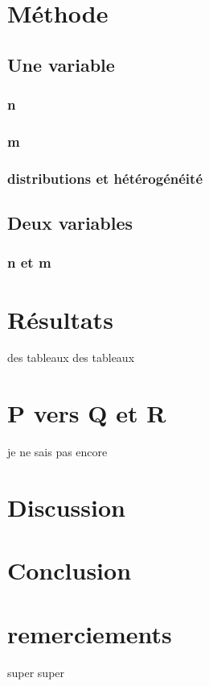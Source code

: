 \documentclass[a4paper,12pt]{report}
\theoremstyle{plain}				%
\theoremstyle{definition}				%
\begin{document}
\section{Méthode} \label{sec:methode}

\subsection{Une variable}\label{subsec:Une variable}

\subsubsection{n}\label{subsubsec:n}

\subsubsection{m}\label{subsubsec:m}

\subsubsection{distributions et hétérogénéité}\label{subsubsec:distributions et hétérogénéité}


\subsection{Deux variables}\label{subsec:Deux variables}

\subsubsection{n et m}\label{subsubsec:n et m}




\cite{5009071}


\section{Résultats} \label{sec:resultats}

des tableaux des tableaux 



\section{P vers Q et R} \label{sec:P vers Q et R}

je ne sais pas encore


\section{Discussion} \label{sec:discussion}


\section{Conclusion} \label{sec:conclusion}

\section{remerciements}


super super



\end{document}

